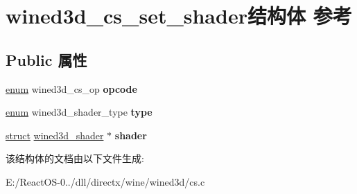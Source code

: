 \hypertarget{structwined3d__cs__set__shader}{}\section{wined3d\+\_\+cs\+\_\+set\+\_\+shader结构体 参考}
\label{structwined3d__cs__set__shader}
\subsection*{Public 属性}
\begin{DoxyCompactItemize}
\item 
\mbox{\label{structwined3d__cs__set__shader_aea587bf5a77d8b3321d57ca9725f30ab}} 
\hyperlink{interfaceenum}{enum} wined3d\+\_\+cs\+\_\+op {\bfseries opcode}
\item 
\mbox{\label{structwined3d__cs__set__shader_afa2905f77fac1a03ab55217b7d8c9044}} 
\hyperlink{interfaceenum}{enum} wined3d\+\_\+shader\+\_\+type {\bfseries type}
\item 
\mbox{\label{structwined3d__cs__set__shader_aa6d98bc6fa2b5dad9680867c56c11aab}} 
\hyperlink{interfacestruct}{struct} \hyperlink{structwined3d__shader}{wined3d\+\_\+shader} $\ast$ {\bfseries shader}
\end{DoxyCompactItemize}


该结构体的文档由以下文件生成\+:\begin{DoxyCompactItemize}
\item 
E\+:/\+React\+O\+S-\/0../dll/directx/wine/wined3d/cs.\+c\end{DoxyCompactItemize}
